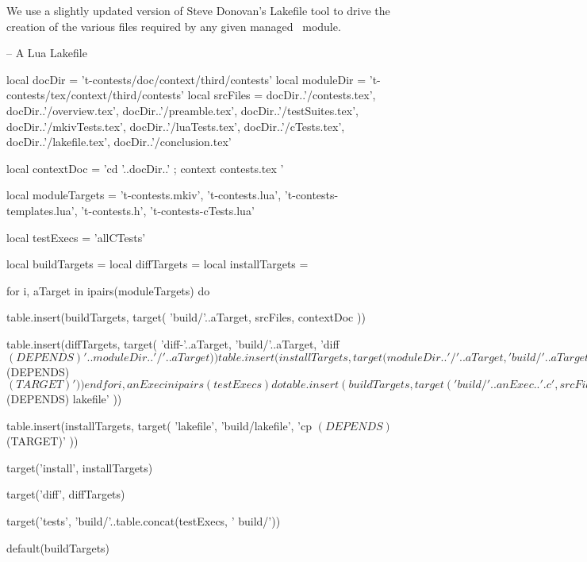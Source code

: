 
\startchapter[title=Lakefile]

We use a slightly updated version of Steve Donovan's Lakefile tool to 
drive the creation of the various files required by any given 
 managed \ConTeXt\ module. 

\startLakefile
-- A Lua Lakefile

local docDir    = 't-contests/doc/context/third/contests'
local moduleDir = 't-contests/tex/context/third/contests'
local srcFiles = {
  docDir..'/contests.tex',
  docDir..'/overview.tex',
  docDir..'/preamble.tex',
  docDir..'/testSuites.tex',
  docDir..'/mkivTests.tex',
  docDir..'/luaTests.tex',
  docDir..'/cTests.tex',
  docDir..'/lakefile.tex',
  docDir..'/conclusion.tex'
}

local contextDoc = 
  'cd '..docDir..' ; context contests.tex '

local moduleTargets = {
  't-contests.mkiv',
  't-contests.lua',
  't-contests-templates.lua',
  't-contests.h',
  't-contests-cTests.lua'
}

local testExecs = {
  'allCTests'
}

local buildTargets   = { }
local diffTargets    = { }
local installTargets = { }

for i, aTarget in ipairs(moduleTargets) do

  table.insert(buildTargets, target(
    'build/'..aTarget,
    srcFiles,
    contextDoc
  ))

  table.insert(diffTargets, target(
    'diff-'..aTarget,
    'build/'..aTarget,
    'diff $(DEPENDS) '..moduleDir..'/'..aTarget
  ))

  table.insert(installTargets, target(
    moduleDir..'/'..aTarget,
    'build/'..aTarget,
    'cp $(DEPENDS) $(TARGET)'
  ))
end

for i, anExec in ipairs(testExecs) do

  table.insert(buildTargets, target(
    'build/'..anExec..'.c',
    srcFiles,
    contextDoc
  ))

  c.program{
    'build/'..anExec,
    src='build/'..anExec..'.c',
    needs='lua5.2'
  }
end

table.insert(buildTargets, target(
  'build/lakefile',
  srcFiles,
  contextDoc
))

table.insert(diffTargets, target(
  'diff-lakefile',
  'build/lakefile',
  'diff $(DEPENDS) lakefile'
))

table.insert(installTargets, target(
  'lakefile',
  'build/lakefile',
  'cp $(DEPENDS) $(TARGET)'
))

target('install', installTargets)

target('diff', diffTargets)

target('tests', 'build/'..table.concat(testExecs, ' build/'))

default(buildTargets)

\stopLakefile

\stopchapter